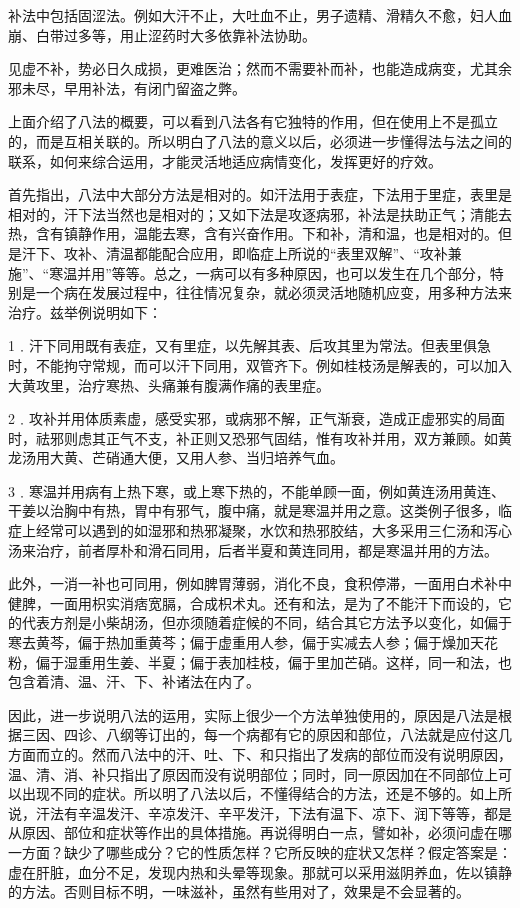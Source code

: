 \documentclass[a4paper,12pt,UTF8,twoside]{ctexbook}
\begin{document}
补法中包括固涩法。例如大汗不止，大吐血不止，男子遗精、滑精久不愈，妇人血崩、白带过多等，用止涩药时大多依靠补法协助。

见虚不补，势必日久成损，更难医治；然而不需要补而补，也能造成病变，尤其余邪未尽，早用补法，有闭门留盗之弊。

上面介绍了八法的概要，可以看到八法各有它独特的作用，但在使用上不是孤立的，而是互相关联的。所以明白了八法的意义以后，必须进一步懂得法与法之间的联系，如何来综合运用，才能灵活地适应病情变化，发挥更好的疗效。

首先指出，八法中大部分方法是相对的。如汗法用于表症，下法用于里症，表里是相对的，汗下法当然也是相对的；又如下法是攻逐病邪，补法是扶助正气；清能去热，含有镇静作用，温能去寒，含有兴奋作用。下和补，清和温，也是相对的。但是汗下、攻补、清温都能配合应用，即临症上所说的“表里双解”、“攻补兼施”、“寒温并用”等等。总之，一病可以有多种原因，也可以发生在几个部分，特别是一个病在发展过程中，往往情况复杂，就必须灵活地随机应变，用多种方法来治疗。兹举例说明如下：

1﹒汗下同用既有表症，又有里症，以先解其表、后攻其里为常法。但表里俱急时，不能拘守常规，而可以汗下同用，双管齐下。例如桂枝汤是解表的，可以加入大黄攻里，治疗寒热、头痛兼有腹满作痛的表里症。

2﹒攻补并用体质素虚，感受实邪，或病邪不解，正气渐衰，造成正虚邪实的局面时，祛邪则虑其正气不支，补正则又恐邪气固结，惟有攻补并用，双方兼顾。如黄龙汤用大黄、芒硝通大便，又用人参、当归培养气血。

3﹒寒温并用病有上热下寒，或上寒下热的，不能单顾一面，例如黄连汤用黄连、干姜以治胸中有热，胃中有邪气，腹中痛，就是寒温并用之意。这类例子很多，临症上经常可以遇到的如湿邪和热邪凝聚，水饮和热邪胶结，大多采用三仁汤和泻心汤来治疗，前者厚朴和滑石同用，后者半夏和黄连同用，都是寒温并用的方法。

此外，一消一补也可同用，例如脾胃薄弱，消化不良，食积停滞，一面用白术补中健脾，一面用枳实消痞宽膈，合成枳术丸。还有和法，是为了不能汗下而设的，它的代表方剂是小柴胡汤，但亦须随着症候的不同，结合其它方法予以变化，如偏于寒去黄芩，偏于热加重黄芩；偏于虚重用人参，偏于实减去人参；偏于燥加天花粉，偏于湿重用生姜、半夏；偏于表加桂枝，偏于里加芒硝。这样，同一和法，也包含着清、温、汗、下、补诸法在内了。

因此，进一步说明八法的运用，实际上很少一个方法单独使用的，原因是八法是根据三因、四诊、八纲等订出的，每一个病都有它的原因和部位，八法就是应付这几方面而立的。然而八法中的汗、吐、下、和只指出了发病的部位而没有说明原因，温、清、消、补只指出了原因而没有说明部位；同时，同一原因加在不同部位上可以出现不同的症状。所以明了八法以后，不懂得结合的方法，还是不够的。如上所说，汗法有辛温发汗、辛凉发汗、辛平发汗，下法有温下、凉下、润下等等，都是从原因、部位和症状等作出的具体措施。再说得明白一点，譬如补，必须问虚在哪一方面？缺少了哪些成分？它的性质怎样？它所反映的症状又怎样？假定答案是：虚在肝脏，血分不足，发现内热和头晕等现象。那就可以采用滋阴养血，佐以镇静的方法。否则目标不明，一味滋补，虽然有些用对了，效果是不会显著的。
\end{document}
